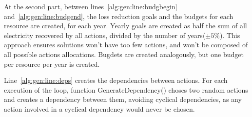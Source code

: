 At the second part, between lines~\ref{alg:gen:line:budgbegin} and~\ref{alg:gen:line:budgend}, the loss reduction goals and the budgets for
each resource are created, for each year. Yearly goals are created as half the sum of all electricity recovered by all actions, divided 
by the number of years($\pm5\%$). This approach ensures solutions won't have too few actions, and won't be composed of all possible 
actions allocations. Bugdets are created analogously, but one budget per resource per year is created.

Line~\ref{alg:gen:line:deps} creates the dependencies between actions. For each execution of the loop, function GenerateDependency() 
choses two random actions and creates a dependency between them, avoiding cyclical dependencies, as any action involved in a cyclical 
dependency would never be chosen.
